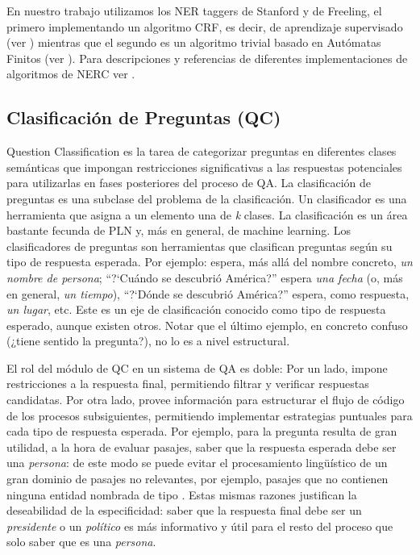 En nuestro trabajo utilizamos los NER taggers de Stanford\cite{NER2} y de Freeling, el primero implementando un algoritmo CRF, es decir, de aprendizaje supervisado (ver ) mientras que el segundo es un algoritmo trivial basado en Autómatas Finitos (ver ). Para descripciones y referencias de diferentes implementaciones de algoritmos de NERC ver \cite{NER1}.


\subsection{Clasificación de Preguntas (QC)}
\label{subsec:qc}
Question Classification es la tarea de categorizar preguntas en diferentes
clases semánticas que impongan restricciones significativas a las respuestas potenciales
para utilizarlas en fases posteriores del proceso de QA.
La clasificación de preguntas es una subclase del problema de la clasificación.
Un clasificador es una herramienta que asigna a un elemento una de
\textit{k} clases. La clasificación es un área bastante fecunda de PLN y, más en general, de machine learning.
Los clasificadores de preguntas son herramientas que clasifican preguntas según su tipo de respuesta esperada. Por ejemplo:
 espera, más allá del nombre concreto, \textit{un nombre de persona}; {\textquotedblleft}?`Cuándo se descubrió
América?{\textquotedblright} espera \textit{una fecha} (o, más en
general, \textit{un tiempo}), {\textquotedblleft}?`Dónde se
descubrió América?{\textquotedblright} espera, como respuesta,
\textit{un lugar}, etc. Este es un eje de clasificación conocido como
tipo de respuesta esperado, aunque existen otros. Notar que el último ejemplo, en concreto confuso (¿tiene sentido la pregunta?), no lo es a nivel estructural.

El rol del módulo de QC en un sistema de QA es doble: Por un lado, impone restricciones a la respuesta final, permitiendo filtrar y verificar respuestas candidatas.
Por otra lado, provee información para estructurar el flujo de código de los procesos subsiguientes, permitiendo implementar estrategias puntuales para cada tipo de respuesta esperada. Por ejemplo, para la pregunta  resulta de gran utilidad, a la hora de evaluar pasajes, saber que la respuesta esperada debe ser una \textit{persona}: de este modo se puede evitar el procesamiento lingüístico de un gran dominio de pasajes no relevantes, por ejemplo, pasajes que no contienen ninguna entidad nombrada de tipo . Estas mismas razones justifican la deseabilidad de la especificidad: saber que la respuesta final debe ser un \textit{presidente} o un \textit{político} es más informativo y útil para el resto del proceso que solo saber que es una \textit{persona}.

